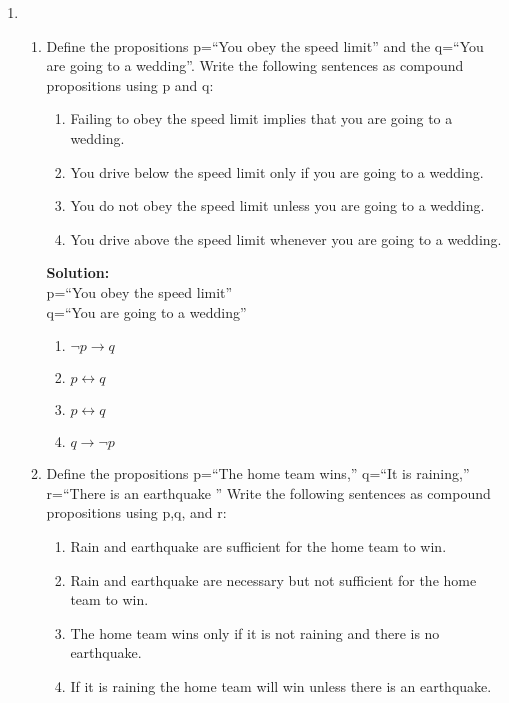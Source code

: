 \documentclass[12pt]{article}
\begin{document}
\begin{enumerate}
    \item
        \begin{enumerate}

            \item Define the propositions p=``You obey the speed limit'' and the q=``You are going to a wedding''. Write the following sentences as compound propositions using p and q: 
                \begin{enumerate}
                    \item Failing to obey the speed limit implies that you are going to a wedding.
                    \item You drive below the speed limit only if you are going to a wedding. 
                    \item You do not obey the speed limit unless you are going to a wedding. 
                    \item You drive above the speed limit whenever you are going to a wedding. 
                \end{enumerate}

                \textbf{Solution: } \\
                p=``You obey the speed limit'' \\
                q=``You are going to a wedding''
                \begin{enumerate}
                    \item $\neg p \rightarrow q $
                    \item $p \leftrightarrow q$
                    \item $p \leftrightarrow q$
                    \item $q \rightarrow \neg p$
                \end{enumerate}

            \item Define the propositions p=``The home team wins,'' q=``It is raining,'' r=``There is an earthquake '' Write the following sentences as compound propositions using p,q, and r:
                \begin{enumerate}
                    \item Rain and earthquake are sufficient for the home team to win. 
                    \item Rain and earthquake are necessary but not sufficient for the home team to win. 
                    \item The home team wins only if it is not raining and there is no earthquake.
                    \item If it is raining the home team will win unless there is an earthquake.  
                \end{enumerate}


\end{enumerate}
\end{enumerate}
\end{document}
